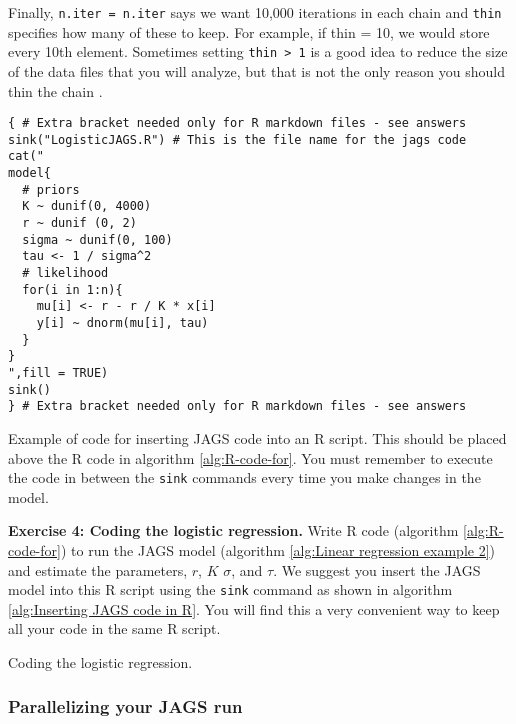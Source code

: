 \documentclass[12pt,english]{article}
\begin{document}
Finally, \texttt{n.iter = n.iter} says we want 10,000 iterations in each chain and \texttt{thin} specifies how many of these to keep. For example, if thin = 10, we would store every 10th element. Sometimes setting \texttt{thin > 1} is a good idea to reduce the size of the data files that you will analyze, but that is not the only reason you should thin the chain \citep{Link:2012ve}.

\begin{algorithm}
\begin{Verbatim}[frame=single]
{ # Extra bracket needed only for R markdown files - see answers
sink("LogisticJAGS.R") # This is the file name for the jags code
cat("
model{
  # priors
  K ~ dunif(0, 4000)
  r ~ dunif (0, 2)
  sigma ~ dunif(0, 100) 
  tau <- 1 / sigma^2
  # likelihood
  for(i in 1:n){
    mu[i] <- r - r / K * x[i]
    y[i] ~ dnorm(mu[i], tau)
  }
}  
",fill = TRUE)
sink()
} # Extra bracket needed only for R markdown files - see answers
\end{Verbatim}
\caption[Example of code for inserting JAGS code within R script]{Example of code for inserting JAGS code into an R script. This should be placed above the R code in algorithm \ref{alg:R-code-for}. You must remember to execute the code in between the \texttt{sink} commands every time you make changes in the model.}
\label{alg:Inserting JAGS code in R}
\end{algorithm}

\belowcaptionskip=-40pt
\begin{exercise}
\begin{mdframed}
\doublespacing
\textbf{Exercise 4: Coding the logistic regression.} Write R code (algorithm \ref{alg:R-code-for}) to run the JAGS model (algorithm \ref{alg:Linear regression example 2}) and estimate the parameters, $r$, $K$ $\sigma$, and $\tau$. We suggest you insert the JAGS model into this R script using the \texttt{sink} command as shown in algorithm \ref{alg:Inserting JAGS code in R}. You will find this a very convenient way to keep all your code in the same R script. 
\end{mdframed}
\captionsetup{textformat=empty, labelformat=empty}
\caption[Coding the logistic regression]{Coding the logistic regression.}
\label{ex:logistic regression sequential}
\end{exercise}
\belowcaptionskip=0pt

\subsubsection{Parallelizing your JAGS run}
\end{document}
